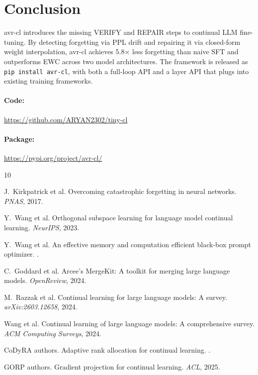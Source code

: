 \documentclass{article}
\begin{document}
\section{Conclusion}

avr-cl introduces the missing VERIFY and REPAIR steps to continual LLM fine-tuning. By detecting forgetting via PPL drift and repairing it via closed-form weight interpolation, avr-cl achieves 5.8$\times$ less forgetting than naive SFT and outperforms EWC across two model architectures. The framework is released as \texttt{pip install avr-cl}, with both a full-loop API and a layer API that plugs into existing training frameworks.

\paragraph{Code:} \url{https://github.com/ARYAN2302/tiny-cl}
\paragraph{Package:} \url{https://pypi.org/project/avr-cl/}


\begin{thebibliography}{10}

J.~Kirkpatrick et al.
\newblock Overcoming catastrophic forgetting in neural networks.
\newblock \emph{PNAS}, 2017.

Y.~Wang et al.
\newblock Orthogonal subspace learning for language model continual learning.
\newblock \emph{NeurIPS}, 2023.

Y.~Wang et al.
\newblock An effective memory and computation efficient black-box prompt optimizer.
.

C.~Goddard et al.
\newblock Arcee's MergeKit: A toolkit for merging large language models.
\newblock \emph{OpenReview}, 2024.

M.~Razzak et al.
\newblock Continual learning for large language models: A survey.
\newblock \emph{arXiv:2603.12658}, 2024.

Wang et al.
\newblock Continual learning of large language models: A comprehensive survey.
\newblock \emph{ACM Computing Surveys}, 2024.

CoDyRA authors.
\newblock Adaptive rank allocation for continual learning.
.

GORP authors.
\newblock Gradient projection for continual learning.
\newblock \emph{ACL}, 2025.

\end{thebibliography}
\end{document}
